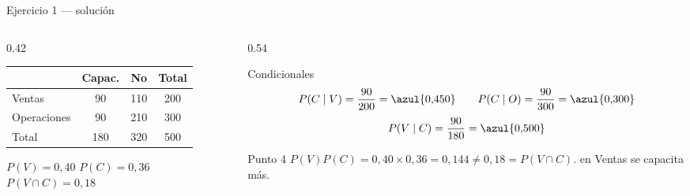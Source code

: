 \documentclass[aspectratio=169,10pt]{beamer}
\begin{document}
\begin{frame}{Ejercicio 1 — solución}
  \begin{columns}[T,onlytextwidth]
    \begin{column}{0.42\textwidth}
      \footnotesize
      \begin{center}
      \begin{tabular}{@{}lccc@{}}
        \toprule
         & Capac. & No & Total \\
        \midrule
        Ventas      & 90  & 110 & 200 \\
        Operaciones & 90  & 210 & 300 \\
        \midrule
        Total       & 180 & 320 & 500 \\
        \bottomrule
      \end{tabular}
      \end{center}
      \vspace{0.2cm}
      {\scriptsize $P(V)=0{,}40$ \quad $P(C)=0{,}36$ \quad
       $P(V\cap C)=0{,}18$}
    \end{column}
    \begin{column}{0.54\textwidth}
      \begin{block}{Condicionales}
        \footnotesize
        \[ P(C\mid V)=\frac{90}{200}=\azul{0{,}450} \qquad
           P(C\mid O)=\frac{90}{300}=\azul{0{,}300} \]
        \[ P(V\mid C)=\frac{90}{180}=\azul{0{,}500} \]
      \end{block}
      \begin{alertblock}{Punto 4}
        \footnotesize
        $P(V)P(C)=0{,}40\times 0{,}36=0{,}144 \neq 0{,}18=P(V\cap C)$.
         en Ventas se capacita más.
      \end{alertblock}
    \end{column}
  \end{columns}
\end{frame}
\end{document}

